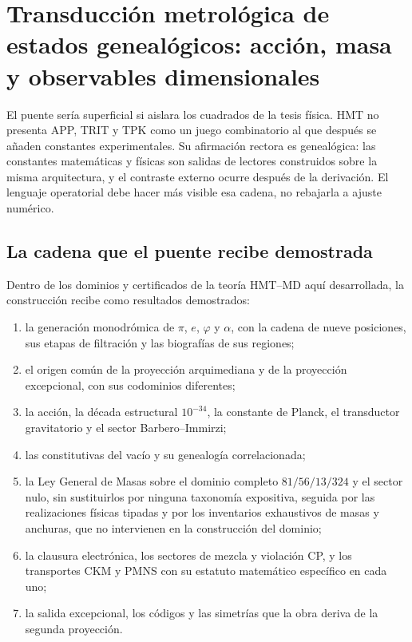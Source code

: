 \section{Transducción metrológica de estados genealógicos: acción, masa y observables dimensionales}
\label{gmc:chap:programa}

El puente sería superficial si aislara los cuadrados de la tesis física. HMT
no presenta APP, TRIT y TPK como un juego combinatorio al que después se
añaden constantes experimentales. Su afirmación rectora es genealógica: las
constantes matemáticas y físicas son salidas de lectores construidos sobre la
misma arquitectura, y el contraste externo ocurre después de la derivación.
El lenguaje operatorial debe hacer más visible esa cadena, no rebajarla a
ajuste numérico.

\subsection{La cadena que el puente recibe demostrada}

Dentro de los dominios y certificados de la teoría HMT--MD aquí desarrollada,
la construcción recibe como
resultados demostrados:

\begin{enumerate}
 \item la generación monodrómica de $\pi$, $e$, $\varphi$ y $\alpha$, con
 la cadena de nueve posiciones, sus etapas de filtración y las biografías de
 sus regiones;
 \item el origen común de la proyección arquimediana y de la proyección
 excepcional, con sus codominios diferentes;
 \item la acción, la década estructural $10^{-34}$, la constante de Planck,
 el transductor gravitatorio y el sector Barbero--Immirzi;
 \item las constitutivas del vacío y su genealogía correlacionada;
 \item la Ley General de Masas sobre el dominio completo
 $81/56/13/324$ y el sector nulo, sin sustituirlos por ninguna taxonomía expositiva, seguida por las realizaciones físicas
 tipadas y por los inventarios exhaustivos de masas y anchuras, que no
 intervienen en la construcción del dominio;
 \item la clausura electrónica, los sectores de mezcla y violación CP, y
 los transportes CKM y PMNS con su estatuto matemático específico en
 cada uno;
 \item la salida excepcional, los códigos y las simetrías que la obra
 deriva de la segunda proyección.
\end{enumerate}

